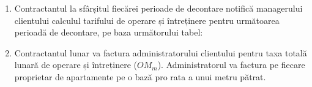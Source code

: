 \begin{enumerate}
\item Contractantul la sfârșitul fiecărei perioade de decontare notifică managerului clientului calculul tarifului de operare și întreținere pentru următoarea perioadă de decontare, pe baza următorului tabel:


\begin{center}
\end{center}

\item Contractantul lunar va factura administratorului clientului pentru taxa totală lunară de operare și întreținere ($OM_m$). Administratorul va factura pe fiecare proprietar de apartamente pe o bază pro rata a unui metru pătrat.

\end{enumerate}
